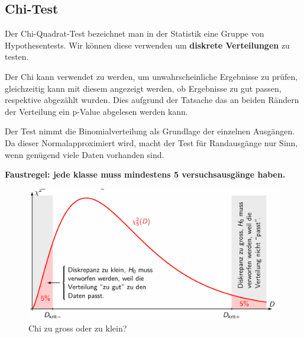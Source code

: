 \documentclass[../Main.tex]{subfiles}
\begin{document}
\subsection{Chi-Test}
Der Chi-Quadrat-Test bezeichnet man in der Statistik eine Gruppe von Hypothesentests.
Wir können diese verwenden um \textbf{diskrete Verteilungen} zu testen.

Der Chi kann verwendet zu werden, um unwahrscheinliche Ergebnisse zu prüfen,
gleichzeitig kann mit diesem angezeigt werden, ob Ergebnisse zu gut passen,
respektive abgezählt wurden. Dies aufgrund der Tatsache das an beiden Rändern
der Verteilung ein p-Value abgelesen werden kann.

Der Test nimmt die Binomialverteilung als Grundlage der einzelnen Ausgängen.
Da dieser Normalapproximiert wird, macht der Test für Randausgänge nur Sinn,
wenn genügend viele Daten vorhanden sind.

\textbf{Faustregel: jede klasse muss mindestens 5 versuchsausgänge haben.}

\begin{figure}[H]
    \centering
    \includegraphics[width=0.75\linewidth]{Images/chi-gross-klein.png}
    \caption{Chi zu gross oder zu klein?}
\end{figure}

\end{document}
